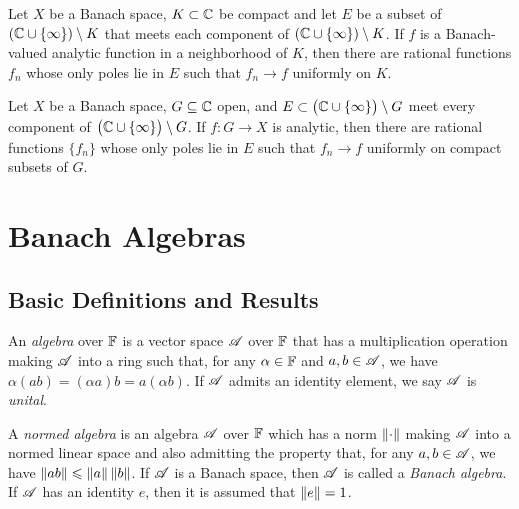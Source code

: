 \begin{theorem}
	Let $X$ be a Banach space, $K \subset \mathbb{C}$ be compact and let $E$ be a subset of $\left(\mathbb{C} \cup \{\infty\}\right)\setminus K$ that meets each component of $\left(	\mathbb{C} \cup \{\infty\}\right) \setminus K$. If $f$ is a Banach-valued analytic function in a neighborhood of $K$, then there are rational functions $f_n$ whose only poles lie in $E$ such that $f_n \rightarrow f$ uniformly on $K$.
\end{theorem}

\begin{theorem}
	Let $X$ be a Banach space, $G \subseteq \mathbb{C}$ open, and $E \subset \bigl( \mathbb{C} \cup \{\infty\}\bigr) \setminus G$ meet every component of $\bigl( \mathbb{C} \cup \{\infty\} \bigr) \setminus G$. If $f:G \rightarrow X$ is analytic, then there are rational functions $\{f_n\}$ whose only poles lie in $E$ such that $f_n \rightarrow f$ uniformly on compact subsets of $G$.
\end{theorem}






\section{Banach Algebras}

\subsection{Basic Definitions and Results}


\begin{definition}
	An \emph{algebra} over $\mathbb{F}$ is a vector space $\mathscr{A}$ over $\mathbb{F}$ that has a multiplication operation making $\mathscr{A}$ into a ring such that, for any $\alpha \in \mathbb{F}$ and $a,b \in \mathscr{A}$, we have $\alpha(ab) = (\alpha a)b = a (\alpha b)$. If $\mathscr{A}$ admits an identity element, we say $\mathscr{A}$ is \emph{unital}.
\end{definition}

\begin{definition}
	A \emph{normed algebra} is an algebra $\mathscr{A}$ over $\mathbb{F}$ which has a norm $\left\lVert \cdot \right\rVert$ making $\mathscr{A}$ into a normed linear space and also admitting the property that, for any $a,b \in \mathscr{A}$, we have $\left\lVert ab \right\rVert \leqslant \left\lVert a \right\rVert \left\lVert b \right\rVert$. If $\mathscr{A}$ is a Banach space, then $\mathscr{A}$ is called a \emph{Banach algebra}. If $\mathscr{A}$ has an identity $e$, then it is assumed that $\left\lVert e \right\rVert = 1$.
\end{definition}

